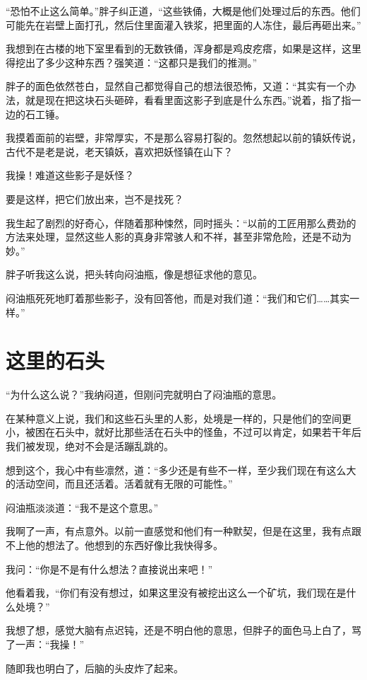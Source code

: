 “恐怕不止这么简单。”胖子纠正道，“这些铁俑，大概是他们处理过后的东西。他们可能先在岩壁上面打孔，然后住里面灌入铁浆，把里面的人冻住，最后再砸出来。”

我想到在古楼的地下室里看到的无数铁俑，浑身都是鸡皮疙瘩，如果是这样，这里得挖出了多少这种东西？强笑道：“这都只是我们的推测。”

胖子的面色依然苍白，显然自己都觉得自己的想法很恐怖，又道：“其实有一个办法，就是现在把这块石头砸碎，看看里面这影子到底是什么东西。”说着，指了指一边的石工锤。

我摸着面前的岩壁，非常厚实，不是那么容易打裂的。忽然想起以前的镇妖传说，古代不是老是说，老天镇妖，喜欢把妖怪镇在山下？

我操！难道这些影子是妖怪？

要是这样，把它们放出来，岂不是找死？

我生起了剧烈的好奇心，伴随着那种悚然，同时摇头：“以前的工匠用那么费劲的方法来处理，显然这些人影的真身非常骇人和不祥，甚至非常危险，还是不动为妙。”

胖子听我这么说，把头转向闷油瓶，像是想征求他的意见。

闷油瓶死死地盯着那些影子，没有回答他，而是对我们道：“我们和它们……其实一样。”

\chapter{这里的石头}

“为什么这么说？”我纳闷道，但刚问完就明白了闷油瓶的意思。

在某种意义上说，我们和这些石头里的人影，处境是一样的，只是他们的空间更小，被困在石头中，就好比那些活在石头中的怪鱼，不过可以肯定，如果若干年后我们被发现，绝对不会是活蹦乱跳的。

想到这个，我心中有些凛然，道：“多少还是有些不一样，至少我们现在有这么大的活动空间，而且还活着。活着就有无限的可能性。”

闷油瓶淡淡道：“我不是这个意思。”

我啊了一声，有点意外。以前一直感觉和他们有一种默契，但是在这里，我有点跟不上他的想法了。他想到的东西好像比我快得多。

我问：“你是不是有什么想法？直接说出来吧！”

他看着我，“你们有没有想过，如果这里没有被挖出这么一个矿坑，我们现在是什么处境？”

我想了想，感觉大脑有点迟钝，还是不明白他的意思，但胖子的面色马上白了，骂了一声：“我操！”

随即我也明白了，后脑的头皮炸了起来。

